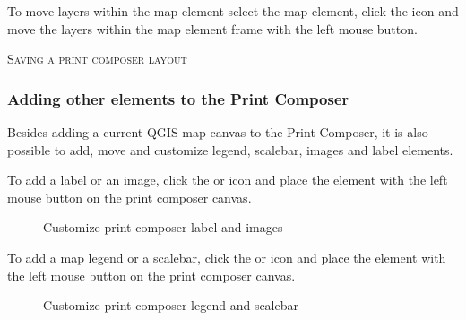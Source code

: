 To move layers within the map element select the map element, click 
the  icon 
and move the layers within the map element frame with the left mouse button.

\begin{Tip}\caption{\textsc{Saving a print composer layout}}
\end{Tip} 

\subsubsection{Adding other elements to the Print Composer} 

Besides adding a current QGIS map canvas to the Print Composer, it is also possible 
to add, move and customize legend, scalebar, images and label elements.


To add a label or an image, click the  or 
 icon and place the element 
with the left mouse button on the print composer canvas.

\begin{figure}[ht]
\centering
\caption{Customize print composer label and images \nixcaption}\label{fig:print_composer_tab2}
   \goodgap
\end{figure}


To add a map legend or a scalebar, click the  or 
 icon and place the element with the left 
mouse button on the print composer canvas.

\begin{figure}[ht]
\centering
\caption{Customize print composer legend and scalebar \nixcaption}\label{fig:print_composer_tab1}
   \goodgap
\end{figure}

